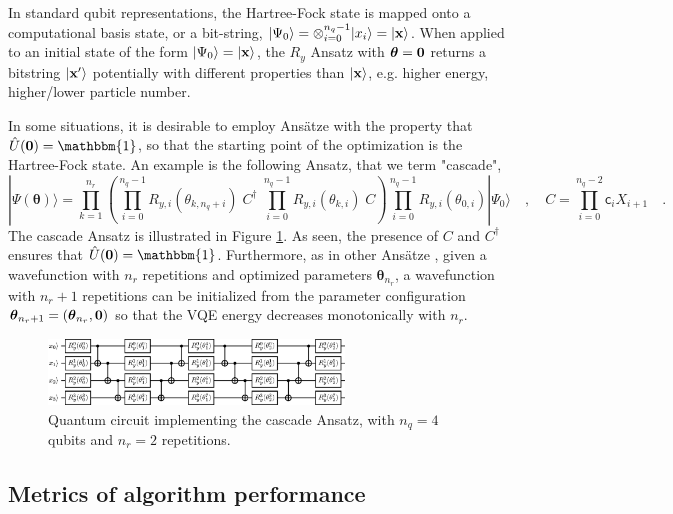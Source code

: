 \documentclass[aps,pra,onecolumn]{revtex4-2}
\newcommand{\bgreek}[1]{{\boldsymbol{#1}}}
\newcommand{\ry}{R_y}
\begin{document}
In standard qubit representations, the Hartree-Fock state is mapped onto a computational basis state, or a bit-string, $| \Psi_0 \rangle = \otimes_{i=0}^{n_q-1} |x_i \rangle = | {\bf{x}} \rangle$.
When applied to an initial state of the form $| \Psi_0 \rangle = | {\bf{x}} \rangle$, the $\ry$ Ansatz with $\bgreek{\theta} = {\bf{0}}$ returns a bitstring $| {\bf{x}}^\prime \rangle$ potentially with
different properties than $| {\bf{x}} \rangle$, e.g. higher energy, higher/lower particle number. 

In some situations, it is desirable to employ Ans\"{a}tze with the property that $\hat{U}({\bf{0}}) = \mathbbm{1}$, so that the starting point of the optimization is the Hartree-Fock state.
An example is the following Ansatz, that we term "cascade",
\begin{equation}
| \Psi(\bgreek{\theta}) \rangle 
= \prod_{k=1}^{n_r}
\left(
\prod_{i=0}^{n_q-1} R_{y,i}(\theta_{k,n_q+i})
\;
C^\dagger
\;
\prod_{i=0}^{n_q-1} R_{y,i}(\theta_{k,i})
\;
C
\right)
\prod_{i=0}^{n_q-1} R_{y,i}(\theta_{0,i}) | \Psi_0 \rangle
\quad,\quad
C = \prod_{i=0}^{n_q-2} \mathsf{c}_i X_{i+1}
\quad.
\end{equation}
The cascade Ansatz is illustrated in Figure \ref{figure:cascade}. As seen, the presence of $C$ and $C^\dagger$ ensures that $\hat{U}({\bf{0}}) = \mathbbm{1}$.
Furthermore, as in other Ans\"{a}tze \cite{qaoa,qubit_cc}, given a wavefunction with $n_r$ repetitions and optimized parameters $\bgreek{\theta}_{n_r}$, 
a wavefunction with $n_r+1$ repetitions can be initialized from the parameter configuration $\bgreek{\theta}_{n_r+1} = ( \bgreek{\theta}_{n_r} , {\bf{0}} )$ 
so that the VQE energy decreases monotonically with $n_r$.
 
\begin{figure}[t!]
\includegraphics[width=0.7\textwidth]{../figures/circuits/cascade.eps}
\caption{Quantum circuit implementing the cascade Ansatz, with $n_q=4$ qubits and $n_r=2$ repetitions.}
\label{figure:cascade}
\end{figure} 

\subsection{Metrics of algorithm performance}
\label{sec:metrics}
\end{document}
